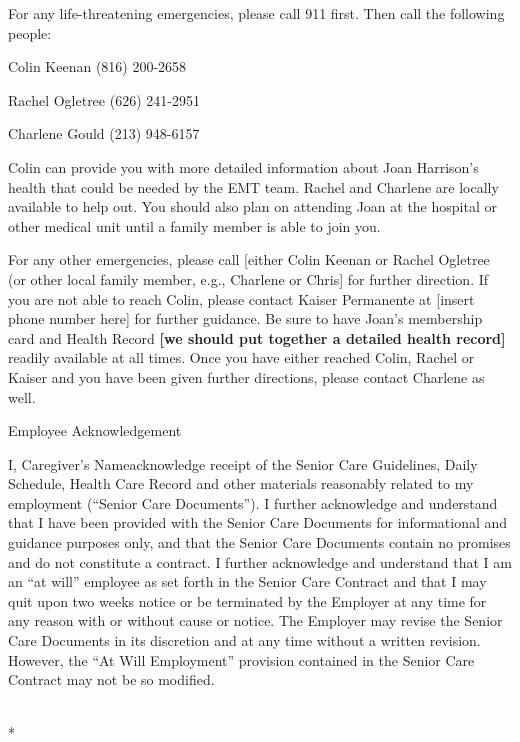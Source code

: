 \documentclass[]{article}
\newcommand{\datefillin}{\hspace{0.2cm}\rule{3cm}{.1pt}}
\newcommand{\tabmed}[1]{\makebox[.22\linewidth][l]{#1}\ignorespaces}
\newcommand{\tablarge}[1]{\makebox[.55\linewidth][l]{#1}\ignorespaces}
\newcommand{\lname}{Caregiver's Name}
\begin{document}
For any life-threatening emergencies, please call 911 first. Then call the following people:

Colin Keenan (816) 200-2658

Rachel Ogletree (626) 241-2951

Charlene Gould (213) 948-6157

Colin can provide you with more detailed information about Joan Harrison's health that could be needed by the EMT team. Rachel and Charlene are locally available to help out. You should also plan on attending Joan at the hospital or other medical unit until a family member is able to join you.

For any other emergencies, please call {[}either Colin Keenan or Rachel Ogletree (or other local family member, e.g., Charlene or Chris{]} for further direction. If you are not able to reach Colin, please contact Kaiser Permanente at {[}insert phone number here{]} for further guidance. Be sure to have Joan's membership card and Health Record \textbf{{[}we should put together a detailed health record{]}} readily available at all times. Once you have either reached Colin, Rachel or Kaiser and you have been given further directions, please contact Charlene as well.

Employee Acknowledgement

I, \lname acknowledge receipt of the Senior Care Guidelines, Daily Schedule, Health Care Record and other materials reasonably related to my employment (``Senior Care Documents''). I further acknowledge and understand that I have been provided with the Senior Care Documents for informational and guidance purposes only, and that the Senior Care Documents contain no promises and do not constitute a contract. I further acknowledge and understand that I am an ``at will'' employee as set forth in the Senior Care Contract and that I may quit upon two weeks notice or be terminated by the Employer at any time for any reason with or without cause or notice.  The Employer may revise the Senior Care Documents in its discretion and at any time without a written revision. However, the ``At Will Employment'' provision contained in the Senior Care Contract may not be so modified.

\vspace{.8cm}
\noindent\tabmed{Employee Signature} \tablarge{\makebox[.5\linewidth]{\hrulefill}} \tabmed{Date\datefillin} \\*
\tabmed{} \tablarge{\textsuperscript{\lname{}}}
\end{document}
